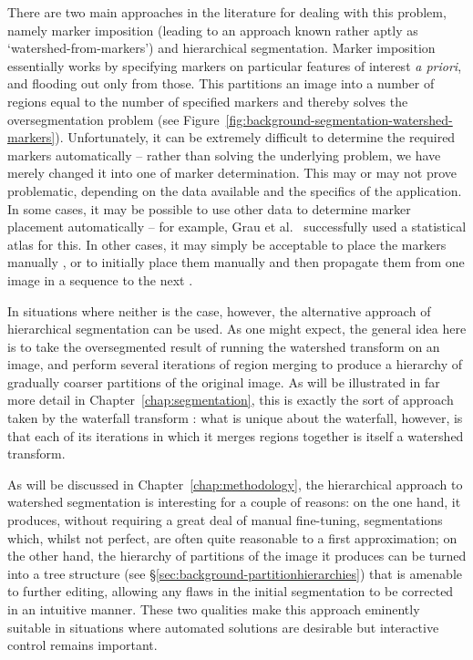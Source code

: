 There are two main approaches in the literature for dealing with this problem, namely marker imposition (leading to an approach known rather aptly as `watershed-from-markers') and hierarchical segmentation. Marker imposition essentially works by specifying markers on particular features of interest \emph{a priori}, and flooding out only from those. This partitions an image into a number of regions equal to the number of specified markers and thereby solves the oversegmentation problem (see Figure~\ref{fig:background-segmentation-watershed-markers}). Unfortunately, it can be extremely difficult to determine the required markers automatically -- rather than solving the underlying problem, we have merely changed it into one of marker determination. This may or may not prove problematic, depending on the data available and the specifics of the application. In some cases, it may be possible to use other data to determine marker placement automatically -- for example, Grau et al.\ \cite{grau04} successfully used a statistical atlas for this. In other cases, it may simply be acceptable to place the markers manually \cite{xue05}, or to initially place them manually and then propagate them from one image in a sequence to the next \cite{flores09}.

In situations where neither is the case, however, the alternative approach of hierarchical segmentation can be used. As one might expect, the general idea here is to take the oversegmented result of running the watershed transform on an image, and perform several iterations of region merging to produce a hierarchy of gradually coarser partitions of the original image. As will be illustrated in far more detail in Chapter~\ref{chap:segmentation}, this is exactly the sort of approach taken by the waterfall transform \cite{beucher90,marcotegui05}: what is unique about the waterfall, however, is that each of its iterations in which it merges regions together is itself a watershed transform.

As will be discussed in Chapter~\ref{chap:methodology}, the hierarchical approach to watershed segmentation is interesting for a couple of reasons: on the one hand, it produces, without requiring a great deal of manual fine-tuning, segmentations which, whilst not perfect, are often quite reasonable to a first approximation; on the other hand, the hierarchy of partitions of the image it produces can be turned into a tree structure (see \S\ref{sec:background-partitionhierarchies}) that is amenable to further editing, allowing any flaws in the initial segmentation to be corrected in an intuitive manner. These two qualities make this approach eminently suitable in situations where automated solutions are desirable but interactive control remains important.

